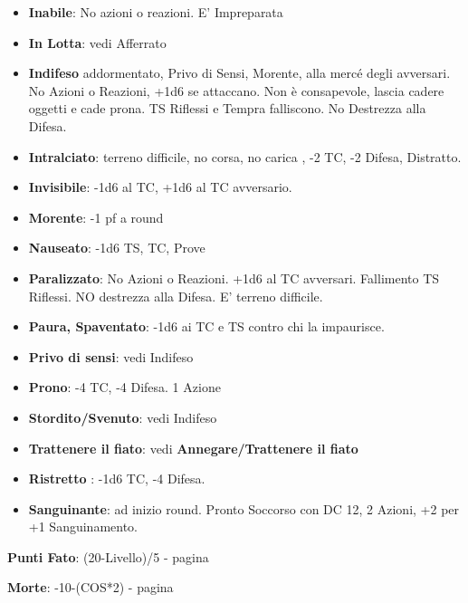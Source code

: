 \documentclass[landscape,10pt,a4paper]{article}
\begin{document}
\begin{multicols}{3}
\begin{dmbox}[title=Condizioni]
\begin{itemize}[leftmargin=0.5cm,itemsep=-1pt,parsep=0pt]
\item \textbf{Inabile}: No azioni o reazioni. E' Impreparata
\item \textbf{In Lotta}: vedi Afferrato
\item \textbf{Indifeso} addormentato, Privo di Sensi, Morente, alla mercé degli avversari. No Azioni o Reazioni, +1d6 se attaccano. Non è consapevole, lascia cadere oggetti e cade prona. TS Riflessi e Tempra falliscono. No Destrezza alla Difesa.
\item \textbf{Intralciato}: terreno difficile, no corsa, no carica , -2 TC, -2 Difesa, Distratto.
\item \textbf{Invisibile}: -1d6 al TC, +1d6 al TC avversario.
\item \textbf{Morente}: -1 pf a round
\item \textbf{Nauseato}: -1d6 TS, TC, Prove
\item \textbf{Paralizzato}: No Azioni o Reazioni. +1d6 al TC avversari. Fallimento TS Riflessi. NO destrezza alla Difesa. E' terreno difficile.
\item \textbf{Paura, Spaventato}: -1d6 ai TC e TS contro chi la impaurisce.
\item \textbf{Privo di sensi}: vedi Indifeso
\item \textbf{Prono}: -4 TC, -4 Difesa. 1 Azione
\item \textbf{Stordito/Svenuto}: vedi Indifeso
\item \textbf{Trattenere il fiato}: vedi \textbf{Annegare/Trattenere il fiato}
\item \textbf{Ristretto} : -1d6 TC, -4 Difesa.
\item \textbf{Sanguinante}: ad inizio round. Pronto Soccorso con DC 12, 2 Azioni, +2 per +1 Sanguinamento.

\end{itemize}

\end{dmbox}

\begin{mybluebox}\textbf{Punti Fato}: (20-Livello)/5 - pagina \pageref{puntifato}\end{mybluebox}

\begin{mybluebox}\textbf{Morte}: -10-(COS*2) - pagina \pageref{morire}\end{mybluebox}

\begin{dmbox}[title=Preparare la Difesa - pagina \pageref{preparareladifesa}]


\end{dmbox}
\end{multicols}
\end{document}
